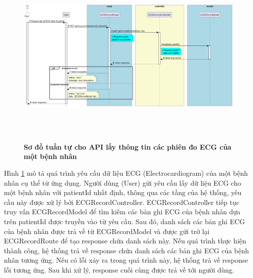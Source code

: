 \begin{figure}[H]
  \centering
  \includegraphics[width=16cm,height=9cm]{Images/server/sequence/server/getEcgRecordsByUserId.png}
  \caption[Sơ đồ tuần tự cho API lấy thông tin các phiên đo ECG của một bệnh nhân]{\bfseries \fontsize{12pt}{0pt}
  \selectfont Sơ đồ tuần tự cho API lấy thông tin các phiên đo ECG của một bệnh nhân }
  \label{getEcgRecordsByUserId} %
\end{figure}
Hình \ref{getEcgRecordsByUserId} mô tả quá trình yêu cầu dữ liệu ECG (Electrocardiogram) của một bệnh nhân cụ thể từ ứng dụng. Người dùng (User) gửi yêu cầu lấy dữ liệu ECG cho một bệnh nhân với patientId nhất định, thông qua các tầng của hệ thống, yêu cầu này được xử lý bởi ECGRecordController. ECGRecordController tiếp tục truy vấn ECGRecordModel để tìm kiếm các bản ghi ECG của bệnh nhân dựa trên patientId được truyền vào từ yêu cầu. Sau đó, danh sách các bản ghi ECG của bệnh nhân được trả về từ ECGRecordModel và được gửi trở lại ECGRecordRoute để tạo response chứa danh sách này. Nếu quá trình thực hiện thành công, hệ thống trả về response chứa danh sách các bản ghi ECG của bệnh nhân tương ứng. Nếu có lỗi xảy ra trong quá trình này, hệ thống trả về response lỗi tương ứng. Sau khi xử lý, response cuối cùng được trả về tới người dùng.


